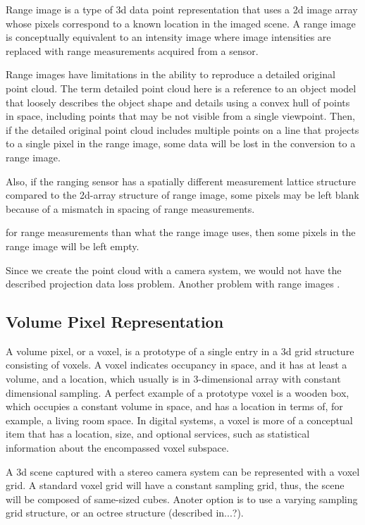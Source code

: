 \documentclass[12pt,a4paper,oneside,pdftex]{report}
\begin{document}
Range image is a type of 3d data point representation that uses a 2d image array whose pixels correspond to a known location in the imaged scene. A range image is conceptually equivalent to an intensity image where image intensities are replaced with range measurements acquired from a sensor.

Range images have limitations in the ability to reproduce a detailed original point cloud. The term detailed point cloud here is a reference to an object model that loosely describes the object shape and details using a convex hull of points in space, including points that may be not visible from a single viewpoint. Then, if the detailed original point cloud includes multiple points on a line that projects to a single pixel in the range image, some data will be lost in the conversion to a range image. 

Also, if the ranging sensor has a spatially different measurement lattice structure compared to the 2d-array structure of range image, some pixels may be left blank because of a mismatch in spacing of range measurements.

for range measurements than what the range image uses, then some pixels in the range image will be left empty.

Since we create the point cloud with a camera system, we would not have the described projection data loss problem. Another problem with range images       \cite{Unnikrishnan08}.

\subsection{Volume Pixel Representation}
\label{subsection:volume_pixel_representation}

A volume pixel, or a voxel, is a prototype of a single entry in a 3d grid structure consisting of voxels. A voxel indicates occupancy in space, and it has at least a volume, and a location, which usually is in 3-dimensional array with constant dimensional sampling. A perfect example of a prototype voxel is a wooden box, which occupies a constant volume in space, and has a location in terms of, for example, a living room space. In digital systems, a voxel is more of a conceptual item that has a location, size, and optional services, such as statistical information about the encompassed voxel subspace. 

A 3d scene captured with a stereo camera system can be represented with a voxel grid. A standard voxel grid will have a constant sampling grid, thus, the scene will be composed of same-sized cubes. Anoter option is to use a varying sampling grid structure, or an octree structure (described in...?).
\end{document}

